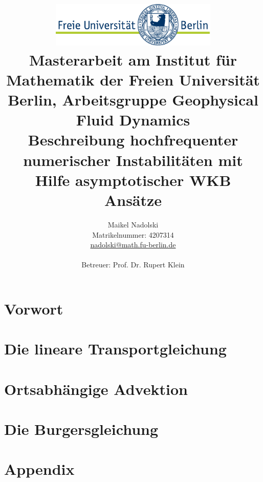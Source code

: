 \documentclass[a4paper
               ,11pt%
               ,openright%
               ,titlepage%
               ]{scrreprt}
\title{\includegraphics[width=0.6\textwidth]{pictures/logo}\\
{\normalsize Masterarbeit am Institut für Mathematik der Freien Universität Berlin, Arbeitsgruppe Geophysical Fluid Dynamics}\\[6ex]
Beschreibung hochfrequenter numerischer Instabilitäten mit Hilfe asymptotischer WKB Ansätze}
\author{Maikel Nadolski\\
{\normalsize Matrikelnummer: 4207314}\\
{\normalsize \href{mailto:nadolski@math.fu-berlin.de}{nadolski@math.fu-berlin.de}}
\vspace{3cm}\\\\
{\normalsize Betreuer: Prof. Dr. Rupert Klein}}
\numberwithin{equation}{section}
\begin{document}
\maketitle

\tableofcontents

\chapter{Vorwort}

% 
\chapter{Die lineare Transportgleichung}

\chapter{Ortsabhängige Advektion}

\chapter{Die Burgersgleichung}




\appendix

\chapter{Appendix}

\end{document}
